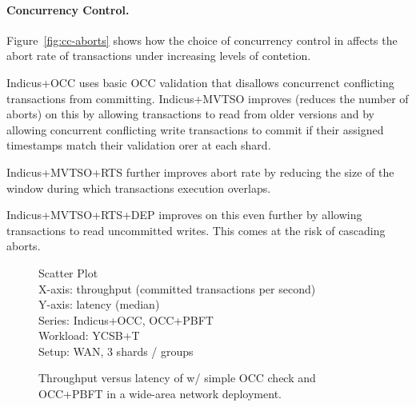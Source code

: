 \paragraph{Concurrency Control.} Figure~\ref{fig:cc-aborts} shows how the choice of concurrency control in
\sys{} affects the abort rate of transactions under increasing levels of 
contetion.

Indicus+OCC uses basic OCC validation that disallows concurrenct conflicting
transactions from committing. Indicus+MVTSO improves (reduces the number of
aborts) on this by allowing transactions to read from older versions and by
allowing concurrent conflicting write transactions to commit if their assigned
timestamps match their validation orer at each shard.

Indicus+MVTSO+RTS further improves abort rate by reducing the size of the window
during which transactions execution overlaps. 

Indicus+MVTSO+RTS+DEP improves on this even further by allowing transactions to
read uncommitted writes. This comes at the risk of cascading aborts.

\begin{figure}
  Scatter Plot\\
  X-axis: throughput (committed transactions per second)\\
  Y-axis: latency (median)\\
  Series: Indicus+OCC, OCC+PBFT\\
  Workload: YCSB+T\\
  Setup: WAN, 3 shards / groups\\
  \caption{Throughput versus latency of \sys{} w/ simple OCC check and
  OCC+PBFT in a wide-area network deployment.}
  \label{fig:to-vs-po-tput-lat}
\end{figure}




